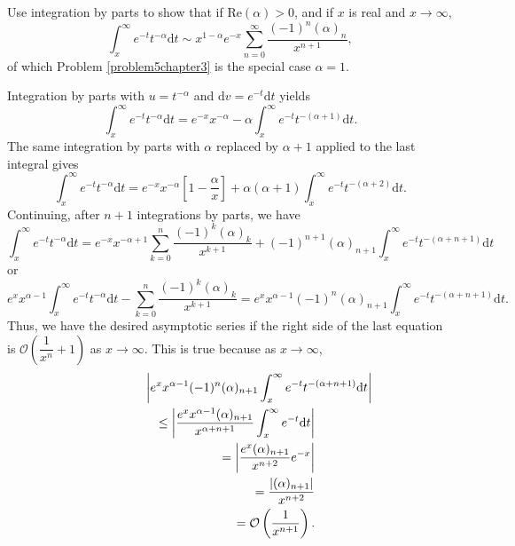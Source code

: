 \begin{problem}\label{problem7chapter3}
Use integration by parts to show that if $\mathrm{Re}(\alpha) > 0$, and if $x$ is real and $x \rightarrow \infty$,
$$\displaystyle\int_x^{\infty} e^{-t}t^{-\alpha} \mathrm{d}t \sim x^{1 - \alpha} e^{-x} \displaystyle\sum_{n=0}^{\infty} \dfrac{(-1)^n (\alpha)_n}{x^{n+1}},$$
of which Problem \ref{problem5chapter3} is the special case $\alpha=1$.
\end{problem}
\begin{solution}
Integration by parts with $u=t^{-\alpha}$ and $\mathrm{d}v = e^{-t} \mathrm{d}t$ yields
$$\displaystyle\int_x^{\infty} e^{-t}t^{-\alpha} \mathrm{d}t = e^{-x} x^{-\alpha} - \alpha \displaystyle\int_x^{\infty} e^{-t} t^{-(\alpha+1)}\mathrm{d}t.$$
The same integration by parts with $\alpha$ replaced by $\alpha+1$ applied to the last integral gives
$$\displaystyle\int_x^{\infty} e^{-t} t^{-\alpha} \mathrm{d}t = e^{-x} x^{-\alpha} \left[ 1 - \dfrac{\alpha}{x} \right] + \alpha(\alpha+1) \displaystyle\int_x^{\infty} e^{-t} t^{-(\alpha+2)}\mathrm{d}t.$$
Continuing, after $n+1$ integrations by parts, we have
$$\displaystyle\int_x^{\infty} e^{-t} t^{-\alpha} \mathrm{d}t = e^{-x} x^{-\alpha+1} \displaystyle\sum_{k=0}^n \dfrac{(-1)^k (\alpha)_k}{x^{k+1}} + (-1)^{n+1} (\alpha)_{n+1} \displaystyle\int_x^{\infty} e^{-t} t^{-(\alpha+n+1)}\mathrm{d}t$$
or
$$e^x x^{\alpha-1} \displaystyle\int_x^{\infty} e^{-t}t^{-\alpha} \mathrm{d}t - \displaystyle\sum_{k=0}^n \dfrac{(-1)^k (\alpha)_k}{x^{k+1}} = e^x x^{\alpha-1}(-1)^n (\alpha)_{n+1} \displaystyle\int_x^{\infty}e^{-t}t^{-(\alpha+n+1)} \mathrm{d}t.$$
Thus, we have the desired asymptotic series if the right side of the last equation is $\mathcal{O} \left( \dfrac{1}{x^n}+1 \right)$ as $x \rightarrow \infty$. This is true because as $x \rightarrow \infty$,
\begin{eqnarray*}
\lefteqn{\left| e^x x^{\alpha-1} (-1)^n (\alpha)_{n+1} \displaystyle\int_x^{\infty} e^{-t} t^{-(\alpha+n+1)}\mathrm{d}t \right|} \\
& &\leq \left| \dfrac{e^x x^{\alpha-1} (\alpha)_{n+1}}{x^{\alpha+n+1}}\displaystyle\int_x^{\infty} e^{-t} \mathrm{d}t \right| \\
& &= \left| \dfrac{e^x (\alpha)_{n+1}}{x^{n+2}} e^{-x} \right| \\
& &= \dfrac{\left| (\alpha)_{n+1} \right|}{x^{n+2}} \\
& &= \mathcal{O} \left( \dfrac{1}{x^{n+1}} \right).
\end{eqnarray*}
\end{solution}